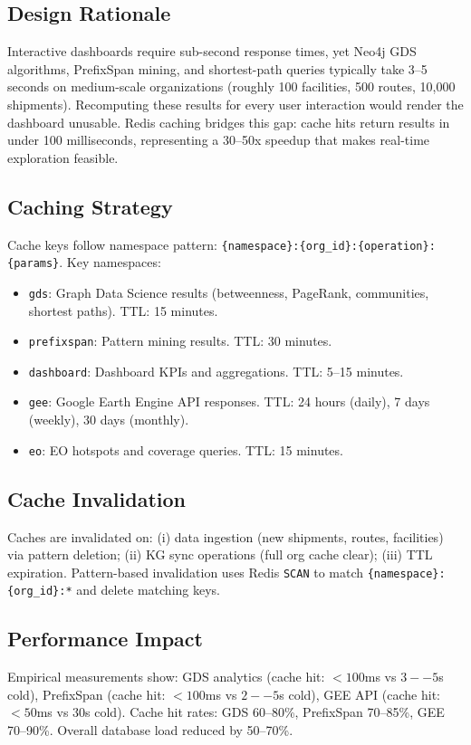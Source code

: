 \documentclass[conference]{IEEEtran}
\begin{document}
\subsection{Design Rationale}
Interactive dashboards require sub-second response times, yet Neo4j GDS algorithms, PrefixSpan mining, and shortest-path queries typically take 3--5 seconds on medium-scale organizations (roughly 100 facilities, 500 routes, 10,000 shipments). Recomputing these results for every user interaction would render the dashboard unusable. Redis caching bridges this gap: cache hits return results in under 100 milliseconds, representing a 30--50x speedup that makes real-time exploration feasible.

\subsection{Caching Strategy}
Cache keys follow namespace pattern: \texttt{\{namespace\}:\{org\_id\}:\{operation\}:\{params\}}. Key namespaces:
\begin{itemize}
  \item \texttt{gds}: Graph Data Science results (betweenness, PageRank, communities, shortest paths). TTL: 15 minutes.
  \item \texttt{prefixspan}: Pattern mining results. TTL: 30 minutes.
  \item \texttt{dashboard}: Dashboard KPIs and aggregations. TTL: 5--15 minutes.
  \item \texttt{gee}: Google Earth Engine API responses. TTL: 24 hours (daily), 7 days (weekly), 30 days (monthly).
  \item \texttt{eo}: EO hotspots and coverage queries. TTL: 15 minutes.
\end{itemize}

\subsection{Cache Invalidation}
Caches are invalidated on: (i) data ingestion (new shipments, routes, facilities) via pattern deletion; (ii) KG sync operations (full org cache clear); (iii) TTL expiration. Pattern-based invalidation uses Redis \texttt{SCAN} to match \texttt{\{namespace\}:\{org\_id\}:*} and delete matching keys.

\subsection{Performance Impact}
Empirical measurements show: GDS analytics (cache hit: $<100$ms vs $3--5$s cold), PrefixSpan (cache hit: $<100$ms vs $2--5$s cold), GEE API (cache hit: $<50$ms vs $30$s cold). Cache hit rates: GDS 60--80\%, PrefixSpan 70--85\%, GEE 70--90\%. Overall database load reduced by 50--70\%.
\end{document}
